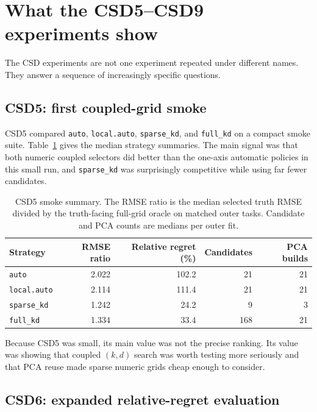 \documentclass[11pt]{article}
\newcommand{\code}[1]{\texttt{#1}}
\begin{document}
\section{What the CSD5--CSD9 experiments show}

The CSD experiments are not one experiment repeated under different names.  They
answer a sequence of increasingly specific questions.

\subsection{CSD5: first coupled-grid smoke}

CSD5 compared \code{auto}, \code{local.auto}, \code{sparse\_kd}, and
\code{full\_kd} on a compact smoke suite.  Table~\ref{tab:csd5} gives the median
strategy summaries.  The main signal was that both numeric coupled selectors did
better than the one-axis automatic policies in this small run, and
\code{sparse\_kd} was surprisingly competitive while using far fewer candidates.

\begin{table}[htbp]
\centering
\caption{CSD5 smoke summary.  The RMSE ratio is the median selected truth RMSE
divided by the truth-facing full-grid oracle on matched outer tasks.  Candidate
and PCA counts are medians per outer fit.}
\label{tab:csd5}
\begin{tabular}{lrrrr}
\toprule
Strategy & RMSE ratio & Relative regret (\%) & Candidates & PCA builds\\
\midrule
\code{auto}       & 2.022 & 102.2 & 21  & 21\\
\code{local.auto} & 2.114 & 111.4 & 21  & 21\\
\code{sparse\_kd} & 1.242 &  24.2 &  9  &  3\\
\code{full\_kd}   & 1.334 &  33.4 & 168 & 21\\
\bottomrule
\end{tabular}
\end{table}

Because CSD5 was small, its main value was not the precise ranking.  Its value
was showing that coupled $(k,d)$ search was worth testing more seriously and
that PCA reuse made sparse numeric grids cheap enough to consider.

\subsection{CSD6: expanded relative-regret evaluation}
\end{document}
